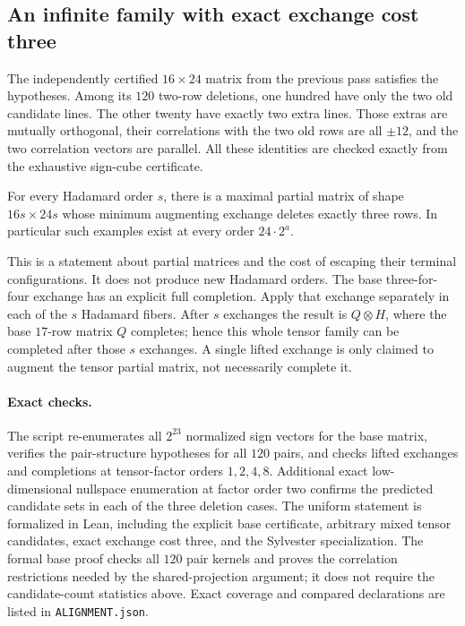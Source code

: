 \subsection{An infinite family with exact exchange cost three}
The independently certified $16\times24$ matrix from the previous pass
satisfies the hypotheses. Among its $120$ two-row deletions, one hundred
have only the two old candidate lines. The other twenty have exactly
two extra lines. Those extras are mutually orthogonal, their
correlations with the two old rows are all $\pm12$, and the two
correlation vectors are parallel. All these identities are checked
exactly from the exhaustive sign-cube certificate.

\begin{corollary}
For every Hadamard order $s$, there is a maximal partial matrix of
shape $16s\times24s$ whose minimum augmenting exchange deletes exactly
three rows. In particular such examples exist at every order
$24\cdot2^a$.
\end{corollary}

This is a statement about partial matrices and the cost of escaping
their terminal configurations. It does not produce new Hadamard orders.
The base three-for-four exchange has an explicit full completion. Apply
that exchange separately in each of the $s$ Hadamard fibers. After
$s$ exchanges the result is $Q\otimes H$, where the base $17$-row
matrix $Q$ completes; hence this whole tensor family can be completed
after those $s$ exchanges. A single lifted exchange is only claimed
to augment the tensor partial matrix, not necessarily complete it.

\paragraph{Exact checks.}
The script  re-enumerates all $2^{23}$
normalized sign vectors for the base matrix, verifies the pair-structure
hypotheses for all $120$ pairs, and checks lifted exchanges and
completions at tensor-factor orders $1,2,4,8$. Additional exact
low-dimensional nullspace enumeration at factor order two confirms
the predicted candidate sets in each of the three deletion cases.
The uniform statement is formalized in Lean, including the explicit
base certificate, arbitrary mixed tensor candidates, exact exchange
cost three, and the Sylvester specialization. The formal base proof
checks all $120$ pair kernels and proves the correlation restrictions
needed by the shared-projection argument; it does not require the
candidate-count statistics above. Exact coverage and compared
declarations are listed in \texttt{ALIGNMENT.json}.
